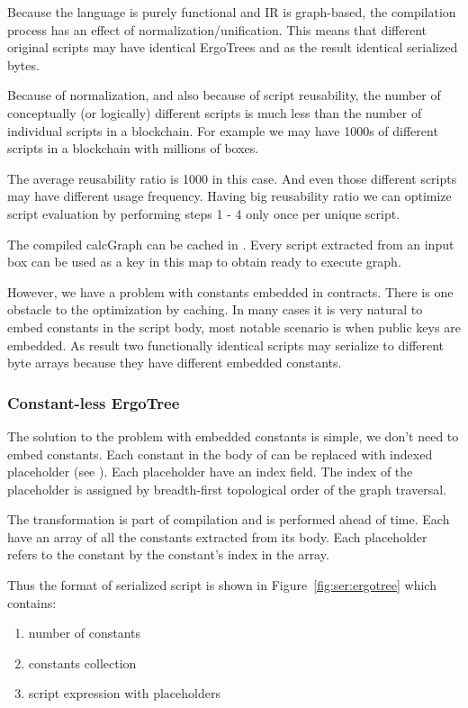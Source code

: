 Because the language is purely functional and IR is graph-based, the
compilation process has an effect of normalization/unification. This means
that different original scripts may have identical ErgoTrees and as the
result identical serialized bytes.

Because of normalization, and also because of script reusability, the number
of conceptually (or logically) different scripts is much less than the number
of individual scripts in a blockchain. For example we may have 1000s of
different scripts in a blockchain with millions of boxes.

The average reusability ratio is 1000 in this case. And even those different
scripts may have different usage frequency. Having big reusability ratio we
can optimize script evaluation by performing steps 1 - 4 only once per unique
script.

The compiled calcGraph can be cached in . Every script extracted from an input box can be used as a key
in this map to obtain ready to execute graph.

However, we have a problem with constants embedded in contracts. There is one
obstacle to the optimization by caching. In many cases it is very natural to
embed constants in the script body, most notable scenario is when public keys
are embedded. As result two functionally identical scripts may serialize to
different byte arrays because they have different embedded constants.

\subsubsection{Constant-less ErgoTree}

The solution to the problem with embedded constants is simple, we don't need
to embed constants. Each constant in the body of \ASDag can be replaced
with indexed placeholder (see \hyperref[sec:appendix:primops:ConstantPlaceholder]{}).
Each placeholder have an index field. The index of the placeholder is
assigned by breadth-first topological order of the graph traversal.

The transformation is part of compilation and is performed ahead of time.
Each \ASDag have an array of all the constants extracted from its body. Each
placeholder refers to the constant by the constant's index in the array.

Thus the format of serialized script is shown in Figure~\ref{fig:ser:ergotree} which contains:
\begin{enumerate}
    \item number of constants
    \item constants collection
    \item script expression with placeholders
\end{enumerate}

